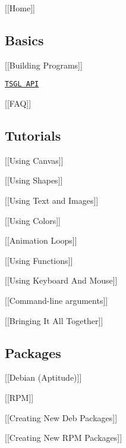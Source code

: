 \mbox{[}\mbox{[}Home\mbox{]}\mbox{]}

\subsection*{Basics}


\begin{DoxyItemize}
\item \mbox{[}\mbox{[}Building Programs\mbox{]}\mbox{]}
\item \href{http://calvin-cs.github.io/TSGL/html/annotated.html}{\tt T\-S\-G\-L A\-P\-I}
\item \mbox{[}\mbox{[}F\-A\-Q\mbox{]}\mbox{]}
\end{DoxyItemize}

\subsection*{Tutorials}


\begin{DoxyItemize}
\item \mbox{[}\mbox{[}Using Canvas\mbox{]}\mbox{]}
\item \mbox{[}\mbox{[}Using Shapes\mbox{]}\mbox{]}
\item \mbox{[}\mbox{[}Using Text and Images\mbox{]}\mbox{]}
\item \mbox{[}\mbox{[}Using Colors\mbox{]}\mbox{]}
\item \mbox{[}\mbox{[}Animation Loops\mbox{]}\mbox{]}
\item \mbox{[}\mbox{[}Using Functions\mbox{]}\mbox{]}
\item \mbox{[}\mbox{[}Using Keyboard And Mouse\mbox{]}\mbox{]}
\item \mbox{[}\mbox{[}Command-\/line arguments\mbox{]}\mbox{]}
\item \mbox{[}\mbox{[}Bringing It All Together\mbox{]}\mbox{]}
\end{DoxyItemize}

\subsection*{Packages}


\begin{DoxyItemize}
\item \mbox{[}\mbox{[}Debian (Aptitude)\mbox{]}\mbox{]}
\item \mbox{[}\mbox{[}R\-P\-M\mbox{]}\mbox{]}
\item \mbox{[}\mbox{[}Creating New Deb Packages\mbox{]}\mbox{]}
\item \mbox{[}\mbox{[}Creating New R\-P\-M Packages\mbox{]}\mbox{]}
\end{DoxyItemize}

